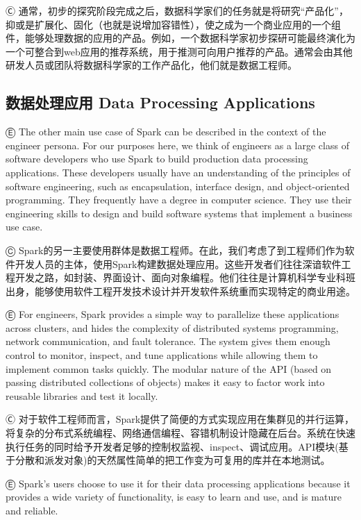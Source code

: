 Ⓒ 通常，初步的探究阶段完成之后，数据科学家们的任务就是将研究``产品化''，抑或是扩展化、固化（也就是说增加容错性），使之成为一个商业应用的一个组件，能够处理数据的应用的产品。例如，一个数据科学家初步探研可能最终演化为一个可整合到web应用的推荐系统，用于推测可向用户推荐的产品。通常会由其他研发人员或团队将数据科学家的工作产品化，他们就是数据工程师。

\subsection{数据处理应用 Data Processing Applications} \label{data-processing-applications}

Ⓔ \textcolor{etc}{The other main use case of Spark can be described in the context of the engineer persona. For our purposes here, we think of engineers as a large class of software developers who use Spark to build production data processing applications. These developers usually have an understanding of the principles of software engineering, such as encapsulation, interface design, and object-oriented programming. They frequently have a degree in computer science. They use their engineering skills to design and build software systems that implement a business use case.}

Ⓒ Spark的另一主要使用群体是数据工程师。在此，我们考虑了到工程师们作为软件开发人员的主体，使用Spark构建数据处理应用。这些开发者们往往深谙软件工程开发之路，如封装、界面设计、面向对象编程。他们往往是计算机科学专业科班出身，能够使用软件工程开发技术设计并开发软件系统重而实现特定的商业用途。

Ⓔ \textcolor{etc}{For engineers, Spark provides a simple way to parallelize these applications across clusters, and hides the complexity of distributed systems programming, network communication, and fault tolerance. The system gives them enough control to monitor, inspect, and tune applications while allowing them to implement common tasks quickly. The modular nature of the API (based on passing distributed collections of objects) makes it easy to factor work into reusable libraries and test it locally.}

Ⓒ 对于软件工程师而言，Spark提供了简便的方式实现应用在集群见的并行运算，将复杂的分布式系统编程、网络通信编程、容错机制设计隐藏在后台。系统在快速执行任务的同时给予开发者足够的控制权监视、inspect、调试应用。API模块(基于分散和派发对象)的天然属性简单的把工作变为可复用的库并在本地测试。

Ⓔ \textcolor{etc}{Spark's users choose to use it for their data processing applications because it provides a wide variety of functionality, is easy to learn and use, and is mature and reliable.}

